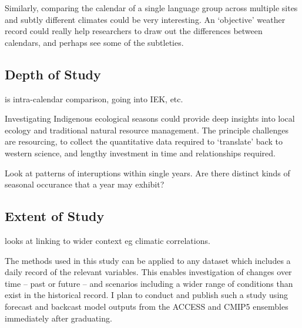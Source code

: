 Similarly, comparing the calendar of a single language group across
multiple sites and subtly different climates could be very interesting.
An `objective' weather record could really help researchers to draw out
the differences between calendars, and perhaps see some of the subtleties.



\subsection{Depth of Study}
is intra-calendar comparison, going into IEK, etc.

Investigating Indigenous ecological seasons could provide deep insights
into local ecology and traditional natural resource management.
The principle challenges are resourcing, to collect the quantitative
data required to `translate' back to western science, and lengthy
investment in time and relationships required.

Look at patterns of interuptions within single years.  Are there distinct
kinds of seasonal occurance that a year may exhibit?



\subsection{Extent of Study}
looks at linking to wider context eg climatic correlations.

The methods used in this study can be applied to any dataset which
includes a daily record of the relevant variables.  This enables
investigation of changes over time -- past or future -- and scenarios
including a wider range of conditions than exist in the historical record.
I plan to conduct and publish such a study using forecast and backcast
model outputs from the ACCESS and CMIP5 ensembles immediately
after graduating.


